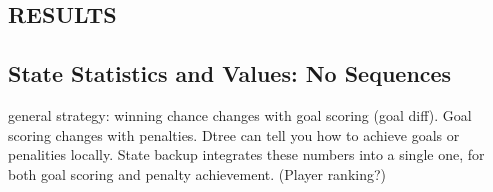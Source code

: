 \documentclass[]{article}
\begin{document}
%

\subsection{RESULTS}


\subsection{State Statistics and Values: No Sequences}

general strategy: winning chance changes with goal scoring (goal diff). Goal scoring changes with penalties.  Dtree can tell you how to achieve goals or penalities locally. State backup integrates these numbers into a single one, for both goal scoring and penalty achievement. (Player ranking?)
\end{document}
